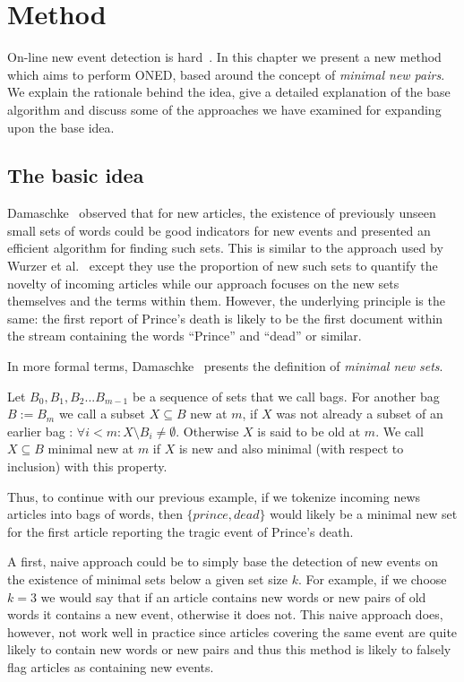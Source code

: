 \chapter{Method}
\label{chapter:method}
On-line new event detection is hard~\cite{allan2000hard}. In this chapter we present a new method which aims to perform ONED, based around the concept of \emph{minimal new pairs}. We explain the rationale behind the idea, give a detailed explanation of the base algorithm and discuss some of the approaches we have examined for expanding upon the base idea.


\section{The basic idea}
\label{section:idea}
Damaschke~\cite{damaschke2015pairs} observed that for new articles, the existence of previously unseen small sets of words could be good indicators for new events and presented an efficient algorithm for finding such sets. This is similar to the approach used by Wurzer et al.~\cite{wurzer2015kterm} except they use the proportion of new such sets to quantify the novelty of incoming articles while our approach focuses on the new sets themselves and the terms within them. However, the underlying principle is the same: the first report of Prince's death is likely to be the first document within the stream containing the words ``Prince'' and ``dead'' or similar. 

In more formal terms, Damaschke~\cite{damaschke2015pairs} presents the definition of \emph{minimal new sets}. 

\begin{definition}
  Let $B_0, B_1, B_2...B_{m-1}$ be a sequence of sets that we call bags. For another bag $B:=B_{m}$ we call a subset $X \subseteq B$ new at $m$, if $X$ was not already a subset of an earlier bag : $\forall i < m : X \setminus B_{i} \neq \emptyset$. Otherwise $X$ is said to be old at $m$. We call $X \subseteq B$ minimal new at $m$ if $X$ is new and also minimal (with respect to inclusion) with this property.
\end{definition}

Thus, to continue with our previous example, if we tokenize incoming news articles into bags of words, then $\{prince, dead\}$ would likely be a minimal new set for the first article reporting the tragic event of Prince's death.

A first, naive approach could be to simply base the detection of new events on the existence of minimal sets below a given set size $k$. For example, if we choose $k=3$ we would say that if an article contains new words or new pairs of old words it contains a new event, otherwise it does not. This naive approach does, however, not work well in practice since articles covering the same event are quite likely to contain new words or new pairs and thus this method is likely to falsely flag articles as containing new events.

